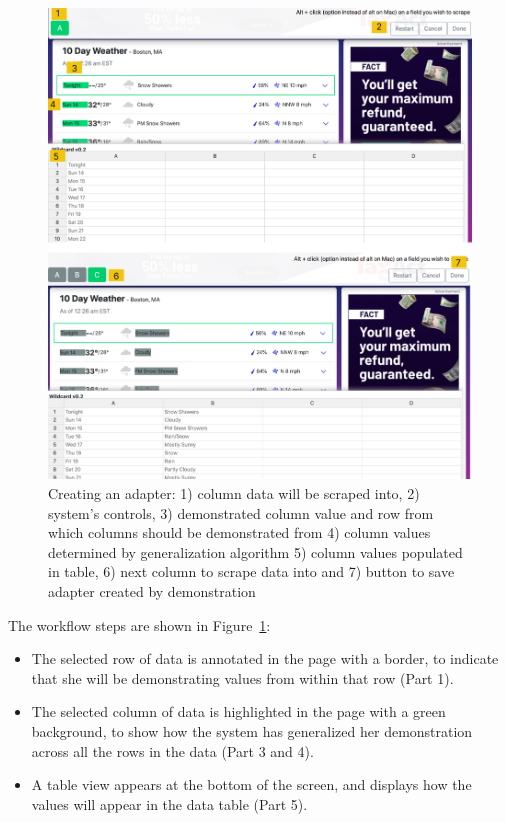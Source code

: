 \documentclass[sigconf,10pt]{acmart}
\providecommand{\tightlist}{%
  \setlength{\itemsep}{0pt}\setlength{\parskip}{0pt}}
\begin{document}
\begin{figure}
  \includegraphics[width=\textwidth]{media/creating.png}
  \caption{\label{fig:creating} Creating an adapter: 1) column data will be scraped into, 2) system's controls, 3) demonstrated column value and row from which columns should be demonstrated from 4) column values determined by generalization algorithm 5) column values populated in table, 6) next column to scrape data into and 7) button to save adapter created by demonstration}
\end{figure}

The workflow steps are shown in Figure~\ref{fig:creating}:

\begin{itemize}
\tightlist
\item
  The selected row of data is annotated in the page with a border, to
  indicate that she will be demonstrating values from within that row
  (Part 1).
\item
  The selected column of data is highlighted in the page with a green
  background, to show how the system has generalized her demonstration
  across all the rows in the data (Part 3 and 4).
\item
  A table view appears at the bottom of the screen, and displays how the
  values will appear in the data table (Part 5).
\end{itemize}
\end{document}
